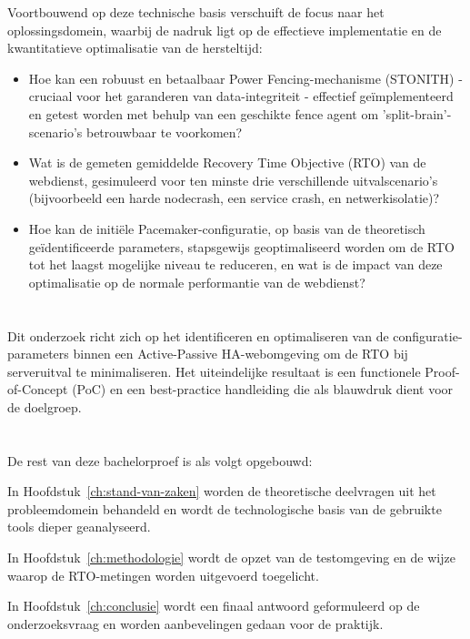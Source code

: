 Voortbouwend op deze technische basis verschuift de focus naar het oplossingsdomein, waarbij de nadruk ligt op de effectieve implementatie en de kwantitatieve optimalisatie van de hersteltijd:
\begin{itemize}
    \item Hoe kan een robuust en betaalbaar Power Fencing-mechanisme (STONITH) - cruciaal voor het garanderen van data-integriteit - effectief geïmplementeerd en getest worden met behulp van een geschikte fence agent om ’split-brain’-scenario’s betrouwbaar te voorkomen?
    \item Wat is de gemeten gemiddelde Recovery Time Objective (RTO) van de webdienst, gesimuleerd voor ten minste drie verschillende uitvalscenario’s (bijvoorbeeld een harde nodecrash, een service crash, en netwerkisolatie)?
    \item Hoe kan de initiële Pacemaker-configuratie, op basis van de theoretisch geïdentificeerde parameters, stapsgewijs geoptimaliseerd worden om de RTO tot het laagst mogelijke niveau te reduceren, en wat is de impact van deze optimalisatie op de normale performantie van de webdienst?
\end{itemize}

\section{}%
\label{sec:onderzoeksdoelstelling}

Dit onderzoek richt zich op het identificeren en optimaliseren van de configuratie-parameters binnen een Active-Passive HA-webomgeving om de RTO bij serveruitval te minimaliseren. Het uiteindelijke resultaat is een functionele Proof-of-Concept (PoC) en een best-practice handleiding die als blauwdruk dient voor de doelgroep.

\section{}%
\label{sec:opzet-bachelorproef}

De rest van deze bachelorproef is als volgt opgebouwd:
\medskip 

In Hoofdstuk~\ref{ch:stand-van-zaken} worden de theoretische deelvragen uit het probleemdomein behandeld en wordt de technologische basis van de gebruikte tools dieper geanalyseerd. 

In Hoofdstuk~\ref{ch:methodologie} wordt de opzet van de testomgeving en de wijze waarop de RTO-metingen worden uitgevoerd toegelicht. 

In Hoofdstuk~\ref{ch:conclusie} wordt een finaal antwoord geformuleerd op de onderzoeksvraag en worden aanbevelingen gedaan voor de praktijk.